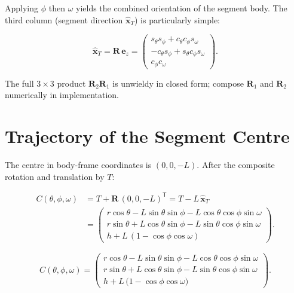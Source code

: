 \documentclass[12pt,a4paper]{article}
\newcommand{\Rd}{\mathbf{R}}
\newcommand{\Rone}{\Rd_1}
\newcommand{\Rtwo}{\Rd_2}
\newcommand{\Rcom}{\Rd}
\begin{document}
Applying $\phi$ then $\omega$ yields the combined orientation of the segment body.
The third column (segment direction $\hat{\mathbf{x}}_T$) is particularly simple:

\begin{equation}\label{eq:xhat}
  \boxed{
  \hat{\mathbf{x}}_T = \Rcom\,\mathbf{e}_z
  = \begin{pmatrix}
      s_\theta s_\phi + c_\theta c_\phi s_\omega \\[2pt]
      -c_\theta s_\phi + s_\theta c_\phi s_\omega \\[2pt]
      c_\phi c_\omega
    \end{pmatrix}}.
\end{equation}

The full $3\times3$ product $\Rtwo\Rone$ is unwieldy in closed form;
compose $\Rone$ and $\Rtwo$ numerically in implementation.

\section{Trajectory of the Segment Centre}

The centre in body-frame coordinates is $(0,0,-L)$.  After the composite rotation
and translation by $T$:

\begin{align}
  C(\theta,\phi,\omega) &= T + \Rcom\,(0,0,-L)^\mathsf{T}
                        = T - L\,\hat{\mathbf{x}}_T \nonumber \\[4pt]
  &= \begin{pmatrix}
       r\cos\theta - L\sin\theta\sin\phi - L\cos\theta\cos\phi\sin\omega \\[8pt]
       r\sin\theta + L\cos\theta\sin\phi - L\sin\theta\cos\phi\sin\omega \\[8pt]
       h + L\,(1 - \cos\phi\cos\omega)
     \end{pmatrix}. \label{eq:center}
\end{align}

\begin{equation}\label{eq:result}
\boxed{
C(\theta,\phi,\omega)
=
\begin{pmatrix}
    r\cos\theta - L\sin\theta\sin\phi - L\cos\theta\cos\phi\sin\omega \\[8pt]
    r\sin\theta + L\cos\theta\sin\phi - L\sin\theta\cos\phi\sin\omega \\[8pt]
    h + L\,\bigl(1 - \cos\phi\cos\omega\bigr)
  \end{pmatrix}.
}
\end{equation}
\end{document}
